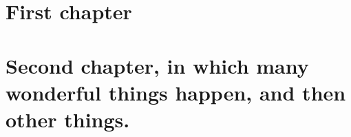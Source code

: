 \documentclass{memoir}
\begin{document}
\renewcommand\chapternumberline[1]{\numberline{#1}}

\tableofcontents*
\chapter{First chapter}
\chapter{Second chapter, in which many wonderful things happen, and then other things.}
\end{document}
